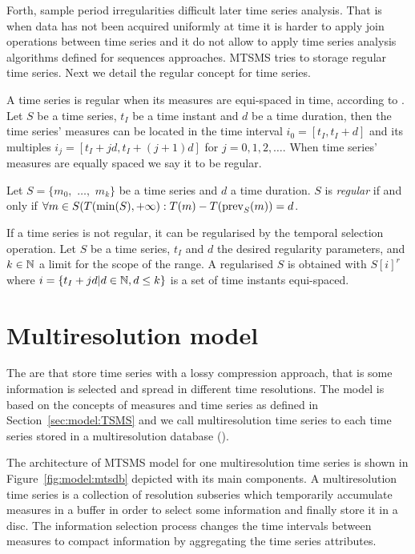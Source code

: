 Forth, sample period irregularities difficult later time series
analysis. That is when data has not been acquired uniformly at time it
is harder to apply join operations between time series and it do not
allow to apply time series analysis algorithms defined for sequences
approaches.  MTSMS tries to storage regular time series.  Next we
detail the regular concept for time series.


A time series is regular when its measures are equi-spaced in time,
according to \cite{last:hetland}. Let $S$ be a time series, $t_I$
be a time instant and $d$ be a time duration, then the time
series' measures can be located in the time interval $i_0=[t_I,
t_I+d]$ and its multiples $i_j=[t_I+jd, t_I+(j+1)d]$
for $j=0,1,2,\ldots$. When time series' measures are equally spaced we
say it to be regular.

\begin{definition}
  Let $S=\{m_0,$ $\ldots,$ $m_k\}$ be a time series and $d$ a time
  duration. $S$ is \emph{regular} if and only if $\forall m \in
  S(T(\min(S),+\infty):T(m) - T(\operatorname*{prev}_S(m)) = d$.
\end{definition}


If a time series is not regular, it can be regularised by the temporal
selection operation. Let $S$ be a time series, $t_I$ and $d$ the
desired regularity parameters, and $k\in\mathbb{N}$ a limit for the scope of
the range.  A regularised $S$ is obtained with $S[i]^r$ where $i =
\{t_I+jd | d\in\mathbb{N}, d\leq k \}$ is a set of time instants equi-spaced.





\section{Multiresolution model}
\label{sec:MTSMS}


The  are  that store time series with a lossy
compression approach, that is some information is selected and spread
in different time resolutions. The  model is based on the
concepts of measures and time series as defined in
Section~\ref{sec:model:TSMS} and we call multiresolution time series
to each time series stored in a multiresolution database
().


The architecture of MTSMS model for one multiresolution time series is
shown in Figure~\ref{fig:model:mtsdb} depicted with its main
components.  A multiresolution time series is a collection of
resolution subseries which temporarily accumulate measures in a buffer
in order to select some information and finally store it in a
disc. The information selection process changes the time intervals
between measures to compact information by aggregating the time series
attributes.

